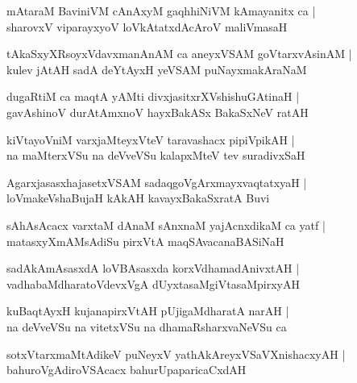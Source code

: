 \documentclass[twoside,12pt,openright]{book}
\newcounter{shloka}[chapter]
\begin{document}
\begin{shloka}%
mAtaraM BaviniVM cAnAxyM gaqhhiNiVM kAmayanitx ca |\\
sharovxV viparayxyoV loVkAtatxdAcAroV maliVmasaH 
\end{shloka}

\begin{shloka}%
tAkaSxyXRsoyxVdavxmanAnAM ca aneyxVSAM goVtarxvAsinAM |\\
kulev jAtAH sadA deYtAyxH yeVSAM puNayxmakAraNaM 
\end{shloka}

\begin{shloka}%
dugaRtiM ca maqtA yAMti divxjasitxrXVshishuGAtinaH |\\
gavAshinoV durAtAmxnoV hayxBakASx BakaSxNeV ratAH
\end{shloka}

\begin{shloka}%
kiVtayoVniM varxjaMteyxVteV taravashacx pipiVpikAH |\\
na maMterxVSu na deVveVSu kalapxMteV tev suradivxSaH 
\end{shloka}

\begin{shloka}%
AgarxjasasxhajasetxVSAM sadaqgoVgArxmayxvaqtatxyaH |\\
loVmakeVshaBujaH kAkAH kavayxBakaSxratA Buvi
\end{shloka}

\begin{shloka}%
sAhAsAcacx varxtaM dAnaM sAnxnaM yajAcnxdikaM ca yatf |\\
matasxyXmAMsAdiSu pirxVtA maqSAvacanaBASiNaH 
\end{shloka}

\begin{shloka}%
sadAkAmAsasxdA loVBAsasxda korxVdhamadAnivxtAH |\\
vadhabaMdharatoVdevxVgA dUyxtasaMgiVtasaMpirxyAH
\end{shloka}

\begin{shloka}%
kuBaqtAyxH kujanapirxVtAH pUjigaMdharatA narAH |\\
na deVveVSu na vitetxVSu na dhamaRsharxvaNeVSu ca 
\end{shloka}

\begin{shloka}%
sotxVtarxmaMtAdikeV puNeyxV yathAkAreyxVSaVXnishacxyAH |\\
bahuroVgAdiroVSAcacx bahurUpaparicaCxdAH
\end{shloka}
\end{document}
